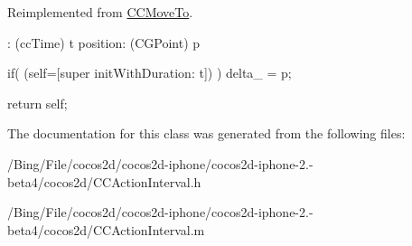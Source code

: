 Reimplemented from \hyperlink{interface_c_c_move_to_a4f3d21350e8ef39c4ba8b9cff21e240b}{C\-C\-Move\-To}.


\begin{DoxyCode}
                      : (ccTime) t position: (CGPoint) p
{
        if( (self=[super initWithDuration: t]) )
                delta_ = p;

        return self;
}
\end{DoxyCode}


The documentation for this class was generated from the following files\-:\begin{DoxyCompactItemize}
\item 
/\-Bing/\-File/cocos2d/cocos2d-\/iphone/cocos2d-\/iphone-\/2.-\/beta4/cocos2d/C\-C\-Action\-Interval.\-h\item 
/\-Bing/\-File/cocos2d/cocos2d-\/iphone/cocos2d-\/iphone-\/2.-\/beta4/cocos2d/C\-C\-Action\-Interval.\-m\end{DoxyCompactItemize}
